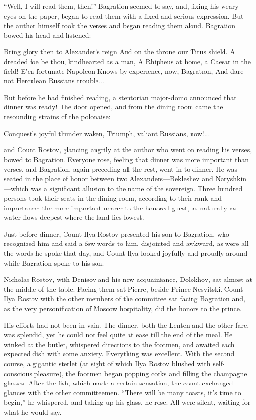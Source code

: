 ``Well, I will read them, then!'' Bagration seemed to say, and,
fixing his weary eyes on the paper, began to read them with a
fixed and serious expression. But the author himself took the
verses and began reading them aloud. Bagration bowed his head and
listened:

Bring glory then to Alexander's reign And on the throne our Titus
shield. A dreaded foe be thou, kindhearted as a man, A Rhipheus
at home, a Caesar in the field! E'en fortunate Napoleon Knows by
experience, now, Bagration, And dare not Herculean Russians
trouble...

But before he had finished reading, a stentorian major-domo
announced that dinner was ready! The door opened, and from the
dining room came the resounding strains of the polonaise:

Conquest's joyful thunder waken, Triumph, valiant Russians,
now!...

and Count Rostov, glancing angrily at the author who went on
reading his verses, bowed to Bagration. Everyone rose, feeling
that dinner was more important than verses, and Bagration, again
preceding all the rest, went in to dinner. He was seated in the
place of honor between two Alexanders---Bekleshev and
Naryshkin---which was a significant allusion to the name of the
sovereign. Three hundred persons took their seats in the dining
room, according to their rank and importance: the more important
nearer to the honored guest, as naturally as water flows deepest
where the land lies lowest.

Just before dinner, Count Ilya Rostov presented his son to
Bagration, who recognized him and said a few words to him,
disjointed and awkward, as were all the words he spoke that day,
and Count Ilya looked joyfully and proudly around while Bagration
spoke to his son.

Nicholas Rostov, with Denisov and his new acquaintance, Dolokhov,
sat almost at the middle of the table. Facing them sat Pierre,
beside Prince Nesvitski. Count Ilya Rostov with the other members
of the committee sat facing Bagration and, as the very
personification of Moscow hospitality, did the honors to the
prince.

His efforts had not been in vain. The dinner, both the Lenten and
the other fare, was splendid, yet he could not feel quite at ease
till the end of the meal. He winked at the butler, whispered
directions to the footmen, and awaited each expected dish with
some anxiety. Everything was excellent. With the second course, a
gigantic sterlet (at sight of which Ilya Rostov blushed with
self-conscious pleasure), the footmen began popping corks and
filling the champagne glasses. After the fish, which made a
certain sensation, the count exchanged glances with the other
committeemen. ``There will be many toasts, it's time to begin,''
he whispered, and taking up his glass, he rose. All were silent,
waiting for what he would say.

